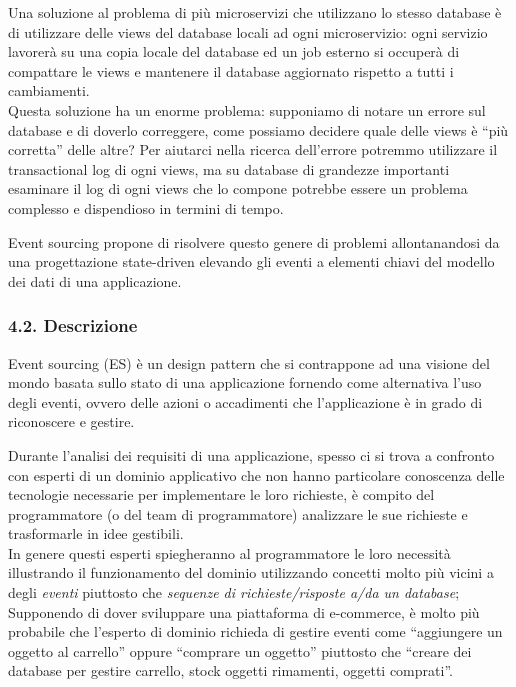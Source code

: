 \documentclass[]{article}
\begin{document}
Una soluzione al problema di più microservizi che utilizzano lo stesso
database è di utilizzare delle views del database locali ad ogni
microservizio: ogni servizio lavorerà su una copia locale del database
ed un job esterno si occuperà di compattare le views e mantenere il
database aggiornato rispetto a tutti i cambiamenti.\\
Questa soluzione ha un enorme problema: supponiamo di notare un errore
sul database e di doverlo correggere, come possiamo decidere quale delle
views è ``più corretta'' delle altre? Per aiutarci nella ricerca
dell'errore potremmo utilizzare il transactional log di ogni views, ma
su database di grandezze importanti esaminare il log di ogni views che
lo compone potrebbe essere un problema complesso e dispendioso in
termini di tempo.

Event sourcing propone di risolvere questo genere di problemi
allontanandosi da una progettazione state-driven elevando gli eventi a
elementi chiavi del modello dei dati di una applicazione.

\subsubsection{4.2. Descrizione}\label{descrizione}

Event sourcing (ES) è un design pattern che si contrappone ad una
visione del mondo basata sullo stato di una applicazione fornendo come
alternativa l'uso degli eventi, ovvero delle azioni o accadimenti che
l'applicazione è in grado di riconoscere e gestire.

Durante l'analisi dei requisiti di una applicazione, spesso ci si trova
a confronto con esperti di un dominio applicativo che non hanno
particolare conoscenza delle tecnologie necessarie per implementare le
loro richieste, è compito del programmatore (o del team di
programmatore) analizzare le sue richieste e trasformarle in idee
gestibili.\\
In genere questi esperti spiegheranno al programmatore le loro necessità
illustrando il funzionamento del dominio utilizzando concetti molto più
vicini a degli \emph{eventi} piuttosto che \emph{sequenze di
richieste/risposte a/da un database}; Supponendo di dover sviluppare una
piattaforma di e-commerce, è molto più probabile che l'esperto di
dominio richieda di gestire eventi come ``aggiungere un oggetto al
carrello'' oppure ``comprare un oggetto'' piuttosto che ``creare dei
database per gestire carrello, stock oggetti rimamenti, oggetti
comprati''.
\end{document}
